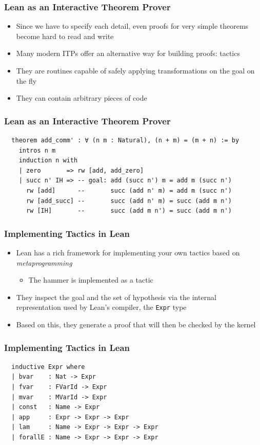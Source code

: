 \documentclass[usepdftitle=false,aspectratio=169,usenames,dvipsnames]{beamer}
\newcommand\vitem{\vfill\item}
\begin{document}
\begin{frame}
  \frametitle{Lean as an Interactive Theorem Prover}
  \begin{itemize}
    \item Since we have to specify each detail, even proofs for very simple theorems become hard to read and write
    \vitem Many modern ITPs offer an alternative way for building proofs: tactics
    \vitem They are routines capable of safely applying transformations on the goal on the fly
    \vitem They can contain arbitrary pieces of code
  \end{itemize}
\end{frame}

\begin{frame}[fragile]
  \frametitle{Lean as an Interactive Theorem Prover}
  \begin{verbatim}
  theorem add_comm' : ∀ (n m : Natural), (n + m) = (m + n) := by
    intros n m
    induction n with
    | zero       => rw [add, add_zero]
    | succ n' IH => -- goal: add (succ n') m = add m (succ n')
      rw [add]      --       succ (add n' m) = add m (succ n')
      rw [add_succ] --       succ (add n' m) = succ (add m n')
      rw [IH]       --       succ (add m n') = succ (add m n')
  \end{verbatim}

\end{frame}

\begin{frame}
  \frametitle{Implementing Tactics in Lean}
  \begin{itemize}
    \item Lean has a rich framework for implementing your own tactics based on \textit{metaprogramming}
    \begin{itemize}
      \item The hammer is implemented as a tactic
    \end{itemize}
    \vitem They inspect the goal and the set of hypothesis via the internal representation used by Lean's compiler, the \texttt{Expr} type
    \vitem Based on this, they generate a proof that will then be checked by the kernel
  \end{itemize}
\end{frame}

\begin{frame}[fragile]
  \frametitle{Implementing Tactics in Lean}
  \begin{verbatim}
  inductive Expr where
  | bvar    : Nat -> Expr
  | fvar    : FVarId -> Expr
  | mvar    : MVarId -> Expr
  | const   : Name -> Expr
  | app     : Expr -> Expr -> Expr
  | lam     : Name -> Expr -> Expr -> Expr
  | forallE : Name -> Expr -> Expr -> Expr
  \end{verbatim}

\end{frame}
\end{document}
